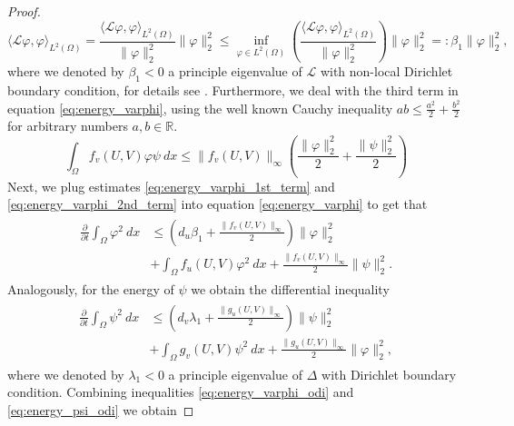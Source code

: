 \documentclass[12pt, a4paper]{article}
\theoremstyle{break}
\theoremstyle{break}
\theoremstyle{break}
\theoremstyle{break}
\theoremstyle{break}
\theoremstyle{break}
\theoremstyle{break}
\begin{document}
\begin{proof}
\begin{equation}
        \langle \mathcal{L}\varphi, \varphi \rangle_{L^2(\Omega)} 
        =
        \frac{\langle \mathcal{L}\varphi, \varphi \rangle_{L^2(\Omega)}}{\|\varphi\|_2^2}\|\varphi\|_2^2
        \leq
        \inf_{\varphi \in L^2(\Omega)}\left( \frac{\langle \mathcal{L}\varphi, \varphi \rangle_{L^2(\Omega)}}{\|\varphi\|^2_2} \right) \|\varphi\|_2^2 =: \beta_1 \|\varphi\|_2^2,
    \end{equation}
    where we denoted by $\beta_1 < 0$ a principle eigenvalue of $\mathcal{L}$ with non-local Dirichlet boundary condition, for details see \cite{GarciaMelianRossi2009}. Furthermore, we deal with the third term in equation \eqref{eq:energy_varphi}, using the well known Cauchy inequality $ab \leq \frac{a^2}{2} + \frac{b^2}{2}$ for arbitrary numbers $a, b \in \mathbb{R}$.
    \begin{equation}
        \label{eq:energy_varphi_2nd_term}
        \int_\Omega f_v(U,V) \varphi \psi \:dx \leq \|f_v(U,V)\|_\infty \left( \frac{\|\varphi\|_2^2}{2} + \frac{\|\psi\|_2^2}{2} \right)
    \end{equation}
    Next, we plug estimates \eqref{eq:energy_varphi_1st_term} and \eqref{eq:energy_varphi_2nd_term} into equation \eqref{eq:energy_varphi} to get that
    \begin{align}
        \label{eq:energy_varphi_odi}
        \begin{split}
            \frac{\partial}{\partial t} \int_\Omega \varphi^2\:dx
            &\leq
            \left(d_u \beta_1 + \frac{\|f_v(U,V)\|_\infty}{2}\right) \|\varphi\|_2^2 \\
            &+
            \int_\Omega f_u(U,V) \varphi^2\:dx + 
            \frac{\|f_v(U,V)\|_\infty}{2}\|\psi\|_2^2.
        \end{split}
    \end{align}
    Analogously, for the energy of $\psi$ we obtain the differential inequality
    \begin{align}
        \label{eq:energy_psi_odi}
        \begin{split}
            \frac{\partial}{\partial t} \int_\Omega \psi^2\:dx
            &\leq
            \left(d_v \lambda_1 + \frac{\|g_u(U,V)\|_\infty}{2} \right) \|\psi\|_2^2 \\
            &+
            \int_\Omega g_v(U,V) \psi^2 \:dx + \frac{\|g_u(U,V)\|_\infty}{2} \|\varphi\|_2^2,
        \end{split}
    \end{align}
    where we denoted by $\lambda_1 < 0$ a principle eigenvalue of $\Delta$ with Dirichlet boundary condition. Combining inequalities \eqref{eq:energy_varphi_odi} and \eqref{eq:energy_psi_odi} we obtain

\end{proof}
\end{document}
